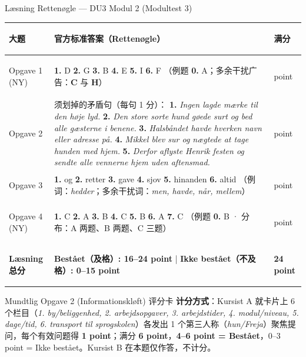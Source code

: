 \begin{grammatikbox}{Læsning Rettenøgle — DU3 Modul 2 (Modultest 3)}
\small
\renewcommand{\arraystretch}{1.24}
\begin{tabularx}{\linewidth}{@{} >{\bfseries\color{NCDNavy}\raggedright\arraybackslash}p{2.3cm} >{\raggedright\arraybackslash}X >{\centering\arraybackslash}p{1.6cm} @{}}
\toprule
\textbf{大题} & \textbf{官方标准答案（Rettenøgle）} & \textbf{满分} \\
\midrule
Opgave 1 (NY) &
\textbf{1.} D \quad \textbf{2.} G \quad \textbf{3.} B \quad \textbf{4.} E \quad \textbf{5.} I \quad \textbf{6.} F \newline
（例题 \textbf{0.} A；多余干扰广告：\textbf{C} 与 \textbf{H}） & 6 point \\
\midrule
Opgave 2 &
须划掉的矛盾句（每句 1 分）：\newline
\textbf{1.} \textit{Ingen lagde mærke til den høje lyd.}\newline
\textbf{2.} \textit{Den store sorte hund gøede surt og bed alle gæsterne i benene.}\newline
\textbf{3.} \textit{Halsbåndet havde hverken navn eller adresse på.}\newline
\textbf{4.} \textit{Mikkel blev sur og nægtede at tage hunden med hjem.}\newline
\textbf{5.} \textit{Derfor aflyste Henrik festen og sendte alle vennerne hjem uden aftensmad.} & 5 point \\
\midrule
Opgave 3 &
\textbf{1.} og \quad \textbf{2.} retter \quad \textbf{3.} gave \quad \textbf{4.} sjov \quad \textbf{5.} hinanden \quad \textbf{6.} altid \newline
（例词：\textit{hedder}；多余干扰词：\textit{men, havde, når, mellem}） & 6 point \\
\midrule
Opgave 4 (NY) &
\textbf{1.} C \quad \textbf{2.} A \quad \textbf{3.} B \quad \textbf{4.} C \quad \textbf{5.} B \quad \textbf{6.} A \quad \textbf{7.} C \newline
（例题 \textbf{0.} B · 分布：A 两题、B 两题、C 三题） & 7 point \\
\midrule
\textbf{Læsning 总分} & \textbf{Bestået（及格）: 16--24 point} \quad | \quad \textbf{Ikke bestået（不及格）: 0--15 point} & \textbf{24 point} \\
\bottomrule
\end{tabularx}
\end{grammatikbox}

\begin{tipbox}{Mundtlig Opgave 2 (Informationskløft) 评分卡}
\small
\textbf{计分方式}：Kursist A 就卡片上 6 个栏目（\textit{1. by/beliggenhed, 2. arbejdsopgaver, 3. arbejdstider, 4. modul/niveau, 5. dage/tid, 6. transport til sprogskolen}）各发出 1 个第三人称（\textit{hun/Freja}）聚焦提问，每个有效问题得 \textbf{1 point}；满分 \textbf{6 point}，\textbf{4--6 point = Bestået}，0--3 point = Ikke bestået。Kursist B 在本题仅作答，不计分。
\end{tipbox}

